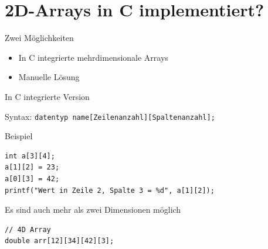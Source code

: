 \documentclass[presentation]{beamer}
\begin{document}
\section{2D-Arrays in C implementiert?}
\label{sec:org97e47c1}
\begin{frame}[label={sec:org0373789}]{Zwei Möglichkeiten}
\begin{itemize}
\item In C integrierte mehrdimensionale Arrays
\item Manuelle Lösung
\end{itemize}
\end{frame}
\begin{frame}[label={sec:orgc50470e},fragile]{In C integrierte Version}
 \begin{block}{Syntax:}
{\color{solarizedYellow}\texttt{datentyp name[Zeilenanzahl][Spaltenanzahl];}}
\end{block}
\begin{block}{Beispiel}
\begin{verbatim}
int a[3][4];
a[1][2] = 23;
a[0][3] = 42;
printf("Wert in Zeile 2, Spalte 3 = %d", a[1][2]);
\end{verbatim}
\end{block}
\begin{block}{Es sind auch mehr als zwei Dimensionen möglich}
\begin{verbatim}
// 4D Array
double arr[12][34][42][3];
\end{verbatim}
\end{block}
\end{frame}
\end{document}
